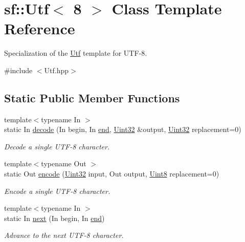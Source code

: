 \hypertarget{classsf_1_1_utf_3_018_01_4}{\section{sf\-:\-:Utf$<$ 8 $>$ Class Template Reference}
\label{classsf_1_1_utf_3_018_01_4}
}


Specialization of the \hyperlink{classsf_1_1_utf}{Utf} template for U\-T\-F-\/8.  




{\ttfamily \#include $<$Utf.\-hpp$>$}

\subsection*{Static Public Member Functions}
\begin{DoxyCompactItemize}
\item 
{\footnotesize template$<$typename In $>$ }\\static In \hyperlink{classsf_1_1_utf_3_018_01_4_a59d4e8d5832961e62b263d308b72bf4b}{decode} (In begin, In \hyperlink{gl3_8h_a432111147038972f06e049e18a837002}{end}, \hyperlink{namespacesf_aa746fb1ddef4410bddf198ebb27e727c}{Uint32} \&output, \hyperlink{namespacesf_aa746fb1ddef4410bddf198ebb27e727c}{Uint32} replacement=0)
\begin{DoxyCompactList}\small\item\em Decode a single U\-T\-F-\/8 character. \end{DoxyCompactList}\item 
{\footnotesize template$<$typename Out $>$ }\\static Out \hyperlink{classsf_1_1_utf_3_018_01_4_a5fbc6b5a996f52e9e4a14633d0d71847}{encode} (\hyperlink{namespacesf_aa746fb1ddef4410bddf198ebb27e727c}{Uint32} input, Out output, \hyperlink{namespacesf_a4ef3d630785c4f296f9b4f274c33d78e}{Uint8} replacement=0)
\begin{DoxyCompactList}\small\item\em Encode a single U\-T\-F-\/8 character. \end{DoxyCompactList}\item 
{\footnotesize template$<$typename In $>$ }\\static In \hyperlink{classsf_1_1_utf_3_018_01_4_a0365a0b38700baa161843563d083edf6}{next} (In begin, In \hyperlink{gl3_8h_a432111147038972f06e049e18a837002}{end})
\begin{DoxyCompactList}\small\item\em Advance to the next U\-T\-F-\/8 character. \end{DoxyCompactList}\item 

\end{DoxyCompactItemize}
